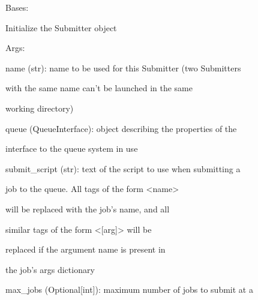 \documentclass[letterpaper,10pt,english]{sphinxmanual}
\begin{document}
\begin{fulllineitems}
\label{doctree/soprano.hpc.submitter.castep:soprano.hpc.submitter.castep.CastepSubmitter}
Bases: {\hyperref[doctree/soprano.hpc.submitter.submit:soprano.hpc.submitter.submit.Submitter]{\emph{}}}

Initialize the Submitter object

\begin{DUlineblock}{0em}
\item[] Args:
\item[]
\begin{DUlineblock}{\DUlineblockindent}
\item[] name (str): name to be used for this Submitter (two Submitters
\item[]
\begin{DUlineblock}{\DUlineblockindent}
\item[] with the same name can't be launched in the same
\item[] working directory)
\end{DUlineblock}
\item[] queue (QueueInterface): object describing the properties of the
\item[]
\begin{DUlineblock}{\DUlineblockindent}
\item[] interface to the queue system in use
\end{DUlineblock}
\item[] submit\_script (str): text of the script to use when submitting a
\item[]
\begin{DUlineblock}{\DUlineblockindent}
\item[] job to the queue. All tags of the form \textless{}name\textgreater{}
\item[] will be replaced with the job's name, and all
\item[] similar tags of the form \textless{}{[}arg{]}\textgreater{} will be
\item[] replaced if the argument name is present in
\item[] the job's args dictionary
\end{DUlineblock}
\item[] max\_jobs (Optional{[}int{]}): maximum number of jobs to submit at a

\end{DUlineblock}
\end{DUlineblock}
\end{fulllineitems}
\end{document}
